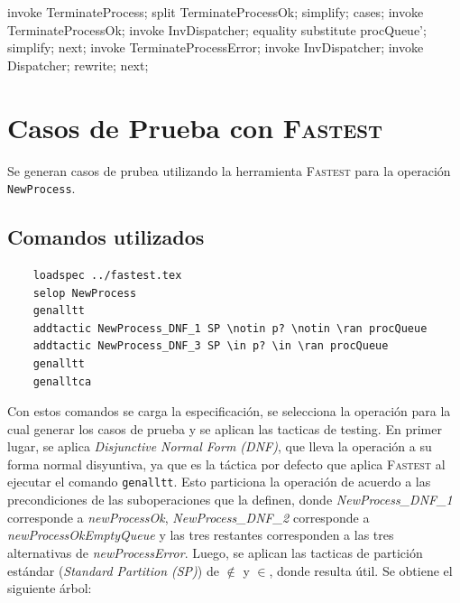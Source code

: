 \documentclass{article}
\begin{document}
\begin{zproof}[TerminateProcessInvDispatcher]
    invoke TerminateProcess;
    split TerminateProcessOk;
    simplify;
    cases;
    invoke TerminateProcessOk;
    invoke InvDispatcher;
    equality substitute procQueue';
    simplify;
    next;
    invoke TerminateProcessError;
    invoke InvDispatcher;
    invoke \Xi Dispatcher;
    rewrite;
    next;
\end{zproof}

\section{Casos de Prueba con \textsc{Fastest}}

Se generan casos de prubea utilizando la herramienta \textsc{Fastest} para la operación \verb|NewProcess|.

\subsection*{Comandos utilizados}

\begin{verbatim}
    loadspec ../fastest.tex
    selop NewProcess
    genalltt
    addtactic NewProcess_DNF_1 SP \notin p? \notin \ran procQueue
    addtactic NewProcess_DNF_3 SP \in p? \in \ran procQueue
    genalltt
    genalltca
\end{verbatim}

Con estos comandos se carga la especificación, se selecciona la operación para la cual generar los casos de prueba y se aplican las tacticas de testing.
En primer lugar, se aplica \textit{Disjunctive Normal Form (DNF)}, que lleva la operación a su forma normal disyuntiva, ya que es la táctica por defecto que aplica \textsc{Fastest} al ejecutar el comando \verb|genalltt|. 
Esto particiona la operación de acuerdo a las precondiciones de las suboperaciones que la definen, donde \textit{NewProcess\_DNF\_1} corresponde a \textit{newProcessOk}, \textit{NewProcess\_DNF\_2} corresponde a \textit{newProcessOkEmptyQueue} y las tres restantes corresponden a las tres alternativas de \textit{newProcessError}.
Luego, se aplican las tacticas de partición estándar (\textit{Standard Partition (SP)}) de $\not\in$ y $\in$, donde resulta útil. Se obtiene el siguiente árbol:

\begin{minipage}{5cm}
\end{minipage}
\end{document}
